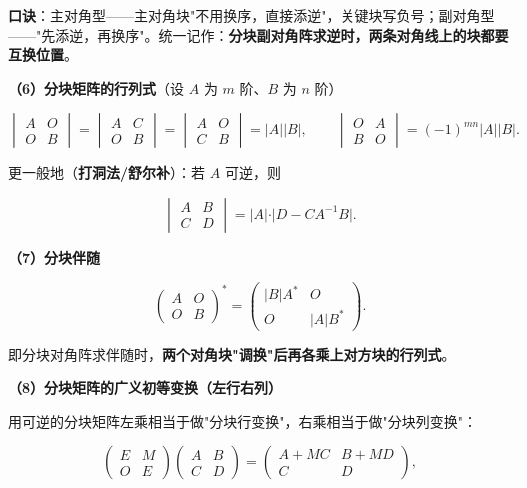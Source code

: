 \documentclass[11pt,openany,UTF8]{ctexbook}
\begin{document}
\textbf{口诀}：主对角型——主对角块"不用换序，直接添逆"，关键块写负号；副对角型——"先添逆，再换序"。统一记作：\textbf{分块副对角阵求逆时，两条对角线上的块都要互换位置}。

\textbf{（6）分块矩阵的行列式}（设 $A$ 为 $m$ 阶、$B$ 为 $n$ 阶）

\[\begin{vmatrix}A&O\\O&B\end{vmatrix}=\begin{vmatrix}A&C\\O&B\end{vmatrix}=\begin{vmatrix}A&O\\C&B\end{vmatrix}=\vert A\vert\vert B\vert,\qquad \begin{vmatrix}O&A\\B&O\end{vmatrix}=(-1)^{mn}\vert A\vert\vert B\vert .\]

更一般地（\textbf{打洞法/舒尔补}）：若 $A$ 可逆，则

\[\begin{vmatrix}A&B\\C&D\end{vmatrix}=\vert A\vert\cdot\vert D-CA^{-1}B\vert .\]

\textbf{（7）分块伴随}

\[\begin{pmatrix}A&O\\O&B\end{pmatrix}^*=\begin{pmatrix}\vert B\vert A^*&O\\O&\vert A\vert B^*\end{pmatrix}.\]

即分块对角阵求伴随时，\textbf{两个对角块"调换"后再各乘上对方块的行列式}。

\textbf{（8）分块矩阵的广义初等变换（左行右列）}

用可逆的分块矩阵左乘相当于做"分块行变换"，右乘相当于做"分块列变换"：

\[\begin{pmatrix}E&M\\O&E\end{pmatrix}\begin{pmatrix}A&B\\C&D\end{pmatrix}=\begin{pmatrix}A+MC&B+MD\\C&D\end{pmatrix},\]
\end{document}

